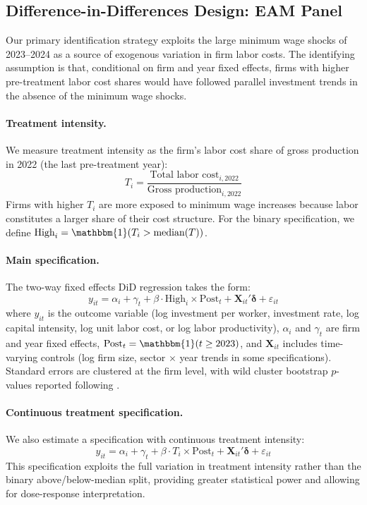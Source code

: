 \documentclass[5p,times,authoryear]{elsarticle}
\begin{document}
\subsection{Difference-in-Differences Design: EAM Panel}
\label{subsec:did_eam}

Our primary identification strategy exploits the large minimum wage shocks of 2023--2024 as a source of exogenous variation in firm labor costs. The identifying assumption is that, conditional on firm and year fixed effects, firms with higher pre-treatment labor cost shares would have followed parallel investment trends in the absence of the minimum wage shocks.

\paragraph{Treatment intensity.} We measure treatment intensity as the firm's labor cost share of gross production in 2022 (the last pre-treatment year):
\begin{equation}
\label{eq:treatment}
T_i = \frac{\text{Total labor cost}_{i,2022}}{\text{Gross production}_{i,2022}}
\end{equation}
Firms with higher $T_i$ are more exposed to minimum wage increases because labor constitutes a larger share of their cost structure. For the binary specification, we define $\text{High}_i = \mathbbm{1}(T_i > \text{median}(T))$.

\paragraph{Main specification.} The two-way fixed effects DiD regression takes the form:
\begin{equation}
\label{eq:did_main}
y_{it} = \alpha_i + \gamma_t + \beta \cdot \text{High}_i \times \text{Post}_t + \mathbf{X}_{it}'\boldsymbol{\delta} + \varepsilon_{it}
\end{equation}
where $y_{it}$ is the outcome variable (log investment per worker, investment rate, log capital intensity, log unit labor cost, or log labor productivity), $\alpha_i$ and $\gamma_t$ are firm and year fixed effects, $\text{Post}_t = \mathbbm{1}(t \geq 2023)$, and $\mathbf{X}_{it}$ includes time-varying controls (log firm size, sector $\times$ year trends in some specifications). Standard errors are clustered at the firm level, with wild cluster bootstrap $p$-values reported following \citet{cameron2008bootstrap}.

\paragraph{Continuous treatment specification.} We also estimate a specification with continuous treatment intensity:
\begin{equation}
\label{eq:did_continuous}
y_{it} = \alpha_i + \gamma_t + \beta \cdot T_i \times \text{Post}_t + \mathbf{X}_{it}'\boldsymbol{\delta} + \varepsilon_{it}
\end{equation}
This specification exploits the full variation in treatment intensity rather than the binary above/below-median split, providing greater statistical power and allowing for dose-response interpretation.
\end{document}
